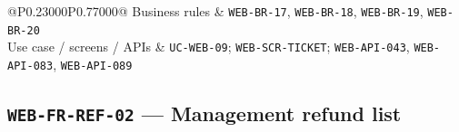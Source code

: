 \begin{longtable}{@{}P{0.23000\SRSWidth}P{0.77000\SRSWidth}@{}}
Business rules & \texttt{WEB-\allowbreak{}BR-\allowbreak{}17}, \texttt{WEB-\allowbreak{}BR-\allowbreak{}18}, \texttt{WEB-\allowbreak{}BR-\allowbreak{}19}, \texttt{WEB-\allowbreak{}BR-\allowbreak{}20} \\[3pt]
Use case /\allowbreak{} screens /\allowbreak{} APIs & \texttt{UC-\allowbreak{}WEB-\allowbreak{}09}; \texttt{WEB-\allowbreak{}SCR-\allowbreak{}TICKET}; \texttt{WEB-\allowbreak{}API-\allowbreak{}043}, \texttt{WEB-\allowbreak{}API-\allowbreak{}083}, \texttt{WEB-\allowbreak{}API-\allowbreak{}089} \\[3pt]
\end{longtable}
\endgroup

\subsection{\texttt{WEB-\allowbreak{}FR-\allowbreak{}REF-\allowbreak{}02} — Management refund list}
\begingroup
\fontsize{9.5}{12}\selectfont
\setlength{\SRSWidth}{\dimexpr\linewidth-2\tabcolsep\relax}
